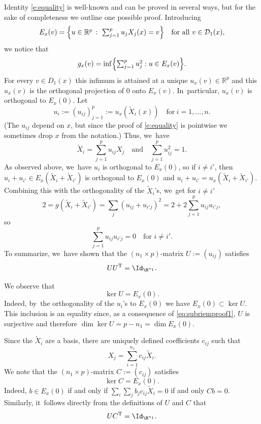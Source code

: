 Identity \eqref{e:equality} is well-known and can be proved in several ways, but for the sake of completeness we outline one possible proof. Introducing
\[
E_x(v)= \Bigl\{\textstyle u\in \mathbb R^p\,:\ \sum_{j=1}^{p} u_j X_j(x) =v\Bigr\}
\quad\text{for all}\ v\in \mathcal D_1(x),
\]
we notice that
\[
g_x(v) = \inf\Bigl\{ \textstyle\sum_{j=1}^p u_j^2 : u\in E_x(v)\Bigr\}.
\]
For every $v\in D_1(x)$ this infimum is attained at a unique $u_x(v)\in \mathbb R^p$ and this $u_x(v)$ is the orthogonal projection of $0$ onto $E_x(v)$. In~particular, $u_x(v)$ is orthogonal to $E_x(0)$. Let
\[
u_i := (u_{ij})_{j=1}^p := u_x(\tilde X_i(x))
\quad\text{for}\ i=1,\ldots, n.
\]
(The $u_{ij}$ depend on $x$, but since the proof of \eqref{e:equality} is pointwise we sometimes drop $x$ from the notation.) Thus, we~have
\[
\tilde{X}_i=\sum_{j=1}^p u_{ij} X_j
\quad\text{and}\quad\sum_{j=1}^p u_{ij}^2=1.
\]
As observed above, we~have $u_i$ is orthogonal to $E_x(0)$, so if $i\neq i'$, then $u_i+ u_{i'}\in E_x(\tilde{X}_i+\tilde X_{i'})$ is orthogonal to $E_x(0)$ and $u_i + u_{i'} = u_x(\tilde{X}_i+\tilde X_{i'})$. Combining this with the orthogonality of the $\tilde{X}_i$'s, we~get for $i\neq i'$
\[
2= g(\tilde X_i+\tilde X_{i'})= \sum_j (u_{ij} +u_{i'j})^2 = 2 +2 \sum_{j=1}^p u_{ij} u_{i' j},
\]
so
\[
\sum_{j=1}^p u_{ij} u_{i' j}=0 \quad\text{for } i\neq i'.
\]
To summarize, we~have shown that the $(n_1\times p)$-matrix $U:=(u_{ij})$ satisfies
\begin{equation}
\label{eq:subriemproof1}
U U^\mathrm{T} = {\Id_{\R^{n_1}}}.
\end{equation}

We observe that
\begin{equation}
\label{eq:subriemproof3}
\ker U = E_x(0).
\end{equation}
Indeed, by~the orthogonality of the $u_i$'s to $E_x(0)$ we have $E_x(0)\subset \ker U$. This inclusion is an equality since, as a consequence of \eqref{eq:subriemproof1}, $U$ is surjective and therefore $\dim \ker U = p - n_1 = \dim E_x(0)$.

Since the $\tilde X_i$ are a basis, there are uniquely defined coefficients $c_{ij}$ such that
\[
X_j =\sum_{i=1}^{n_1} c_{ij} \tilde X_i.
\]
We note that the $(n_1\times p)$-matrix $C :=(c_{ij})$ satisfies
\begin{equation}
\label{eq:subriemproof4}
\ker C = E_x(0).
\end{equation}
Indeed, $b\in E_x(0)$ if and only if $\sum_i \sum_j b_j c_{ij} \tilde X_i = 0$ if and only $C b =0$. Similarly, it~follows directly from the definitions of $U$ and $C$ that
\begin{equation}
\label{eq:subriemproof2}
U C^\mathrm{T} = {\Id_{\R^{n_1}}}.
\end{equation}

